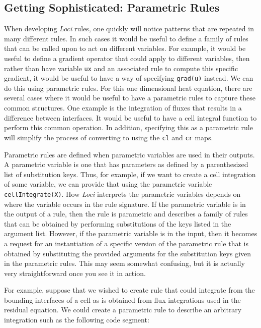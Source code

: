 \documentclass[10pt,epsf,letterpaper,twoside]{book}
\begin{document}
\subsection{Getting Sophisticated: Parametric Rules}

When developing {\it Loci} rules, one quickly will notice patterns that are
repeated in many different rules.  In such cases it would be useful to
define a family of rules that can be called upon to act on different
variables.  For example, it would be useful to define a gradient
operator that could apply to different variables, then rather than
have variable {\tt ux} and an associated rule to compute this specific
gradient, it would be useful to have a way of specifying {\tt grad(u)}
instead.  We can do this using parametric rules.  For this one
dimensional heat equation, there are several cases where it would be
useful to have a parametric rules to capture these common structures.
One example is the integration of fluxes that results in a difference
between interfaces.  It would be useful to have a cell integral
function to perform this common operation.  In addition, specifying
this as a parametric rule will simplify the process of converting to
using the {\tt cl} and {\tt cr} maps.  

Parametric rules are defined when parametric variables are used in
their outputs.  A parametric variable is one that has parameters as
defined by a parenthesized list of substitution keys.  Thus, for
example, if we want to create a cell integration of some variable, we
can provide that using the parametric variable {\tt cellIntegrate(X)}.
How {\it Loci} interprets the parametric variables depends on where the
variable occurs in the rule signature.  If the parametric variable is
in the output of a rule, then the rule is parametric and describes a
family of rules that can be obtained by performing substitutions of
the keys listed in the argument list.  However, if the parametric
variable is in the input, then it becomes a request for an
instantiation of a specific version of the parametric rule that is
obtained by substituting the provided arguments for the substitution
keys given in the parametric rules.  This may seem somewhat confusing,
but it is actually very straightforward once you see it in action.

For example, suppose that we wished to create rule that could
integrate from the bounding interfaces of a cell as is obtained from
flux integrations used in the residual equation.  We could create a
parametric rule to describe an arbitrary integration such as the
following code segment:
\end{document}
